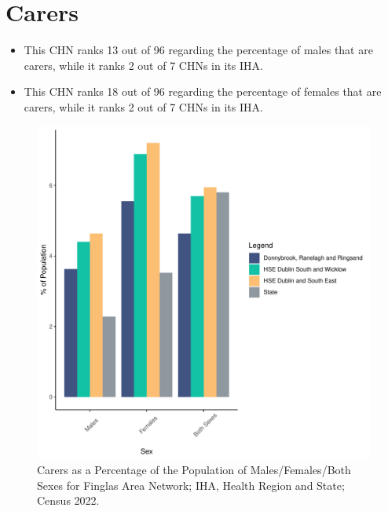 \documentclass{article}
\begin{document}
\section{Carers}\label{sect:Carers}
\begin{itemize}
\item This CHN ranks  13 out of 96 regarding the percentage of males that are carers, while it ranks   2 out of 7 CHNs in its IHA.
\item This CHN ranks  18 out of 96 regarding the percentage of females that are carers, while it ranks   2 out of 7 CHNs in its IHA.
\end{itemize}
\begin{figure}[H]
	\centering
	\includegraphics[width = 150mm]{../figures/CareED.pdf}
	\caption{Carers as a Percentage of the Population of Males/Females/Both Sexes for Finglas Area Network; IHA, Health Region and State; Census 2022.}
	\label{fig:2ae19629-1a6a-13a3-e055-000000000001}
	\end{figure}
\end{document}
